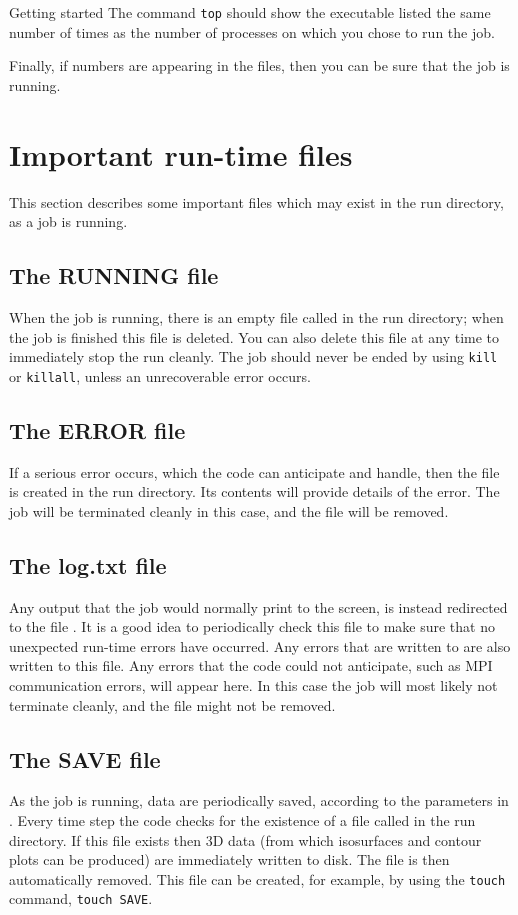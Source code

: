 \begin{chapter}{\label{cha:quickstart}Getting started}
  The command \verb"top" should show the  executable listed the
  same number of times as the number of processes on which you chose to run the
  job.

  Finally, if numbers are appearing in the  files, then you can
  be sure that the job is running.

  \section{Important run-time files}
  This section describes some important files which may exist in the run
  directory, as a job is running.

  \subsection{The RUNNING file}
  When the job is running, there is an empty file called  in
  the run directory; when the job is finished this file is deleted.  You can
  also delete this file at any time to immediately stop the run cleanly.  The
  job should never be ended by using \verb"kill" or \verb"killall", unless an
  unrecoverable error occurs.

  \subsection{The ERROR file}
  If a serious error occurs, which the code can anticipate and handle, then the
   file is created in the run directory.  Its contents will
  provide details of the error.  The job will be terminated cleanly in this
  case, and the  file will be removed.

  \subsection{The log.txt file}
  Any output that the job would normally print to the screen, is instead
  redirected to the file .  It is a good idea to periodically
  check this file to make sure that no unexpected run-time errors have
  occurred.  Any errors that are written to  are also written
  to this file.  Any errors that the code could not anticipate, such as MPI
  communication errors, will appear here.  In this case the job will most
  likely not terminate cleanly, and the  file might not be
  removed.

  \subsection{The SAVE file}
  As the job is running, data are periodically saved, according to the
   parameters in .  Every time step the
  code checks for the existence of a file called  in the run
  directory.  If this file exists then 3D data (from which isosurfaces and
  contour plots can be produced) are immediately written to disk.  The
   file is then automatically removed.  This file can be created,
  for example, by using the \verb"touch" command, \ie \verb"touch SAVE".


\end{chapter}
